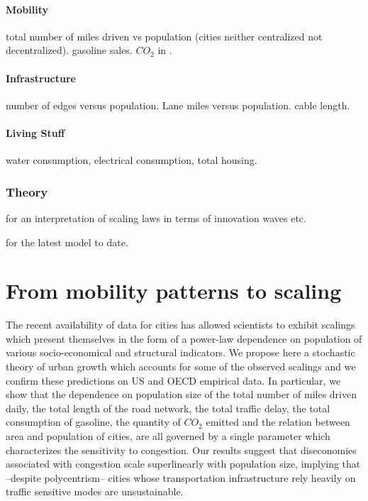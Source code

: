 \paragraph{Mobility} \cite{Samaniego:2008} total number of miles driven vs
population (cities neither centralized not decentralized).
\cite{Bettencourt:2007} gasoline sales. $CO_2$ in \cite{Fragkias:2013,
Oliveira:2014, Rybksi:2013}.

\paragraph{Infrastructure} \cite{Veregin:1997} number of edges versus population.
\cite{Samaniego:2008} Lane miles versus population. \cite{Bettencourt:2007}
cable length.

\paragraph{Living Stuff} \cite{Bettencourt:2007} water consumption, electrical
consumption, total housing.

    \subsubsection{Theory}
    \label{ssub:theory}
    
\cite{Pumain:2006} for an interpretation of scaling laws in terms of
innovation waves etc.

\cite{Bettencourt:2013} for the latest model to date.


\section{From mobility patterns to scaling}
\label{sec:from_mobility_patterns_to_scaling}


The recent availability of data for cities has allowed scientists to exhibit scalings which present themselves in the form of a power-law dependence on population of various socio-economical and structural indicators. We propose here a stochastic theory of urban growth which accounts for some of the observed scalings and we confirm these predictions on US and OECD empirical data. In particular, we show that the dependence on population size of the total number of miles driven daily, the total length of the road network, the total traffic delay, the total consumption of gasoline, the quantity of $CO_2$ emitted and the relation between area and population of cities, are all governed by a single parameter which characterizes the sensitivity to congestion. Our results suggest that diseconomies associated with congestion scale superlinearly with population size, implying that --despite polycentrism-- cities whose transportation infrastructure rely heavily on traffic sensitive modes are unsustainable.



